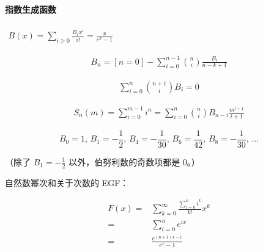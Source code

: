 \documentclass[a4paper, twoside]{article}
\begin{document}
        \paragraph{指数生成函数} $\begin{aligned} B(x)=\sum_{i\ge 0}\frac{B_i x^i}{i!}=\frac x{e^x-1} \end{aligned}$

        $$ \begin{aligned}B_n=[n=0]-\sum_{i=0}^{n-1} \binom{n}{i} \frac{B_i}{n-k+1}\end{aligned} $$
        
        $$ \begin{aligned}\sum_{i=0}^n\binom{n+1}{i}B_i=0\end{aligned} $$
        
        $$ \begin{aligned}S_n(m)=\sum_{i=0}^{m-1}i^n=\sum_{i=0}^n\binom{n}{i}B_{n-i}\frac{m^{i+1}}{i+1}\end{aligned} $$
        
        $$ B_0 = 1,\, B_1 = -\frac 1 2,\, B_4 = -\frac 1 {30},\, B_6 = \frac 1 {42},\, B_8 = -\frac 1{30},\, \dots $$
        
        （除了 $B_1 = -\frac 1 2$ 以外，伯努利数的奇数项都是 $0$。）
        
        自然数幂次和关于次数的 EGF：
        
        $$ \begin{aligned} F(x)=&\sum_{k=0}^\infty \frac{\sum_{i=0}^n i^k}{k!}x^k\\ =&\sum_{i=0}^n e^{ix}\\ =&\frac{e^{(n+1)x-1}}{e^x-1} \end{aligned} $$
        
\end{document}

